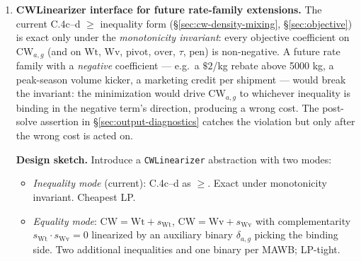 \documentclass[11pt,a4paper]{article}
\theoremstyle{definition}
\begin{document}
\begin{enumerate}
        and broker-of-record handoff as additional supply-option types.
  \item \label{item:cwlinearizer-interface} \textbf{CWLinearizer interface
        for future rate-family extensions.} The current C.4c--d $\geq$
        inequality form (\S\ref{sec:cw-density-mixing}, \S\ref{sec:objective})
        is exact only under the \emph{monotonicity invariant}: every
        objective coefficient on $\text{CW}_{a,g}$ (and on $\text{Wt}$,
        $\text{Wv}$, $\text{pivot}$, $\text{over}$, $\tau$, $\text{pen}$)
        is non-negative. A future rate family with a \emph{negative}
        coefficient --- e.g.\ a $\$2$/kg rebate above 5000 kg, a
        peak-season volume kicker, a marketing credit per shipment ---
        would break the invariant: the minimization would drive
        $\text{CW}_{a,g}$ to whichever inequality is binding in the
        negative term's direction, producing a wrong cost. The post-solve
        assertion in \S\ref{sec:output-diagnostics} catches the
        violation but only after the wrong cost is acted on.

  \textbf{Design sketch.} Introduce a \texttt{CWLinearizer} abstraction
  with two modes:
    \begin{itemize}[noitemsep]
      \item \emph{Inequality mode} (current): C.4c--d as $\geq$. Exact
            under monotonicity invariant. Cheapest LP.
      \item \emph{Equality mode}: $\text{CW} = \text{Wt} + s_{\text{Wt}}$,
            $\text{CW} = \text{Wv} + s_{\text{Wv}}$ with complementarity
            $s_{\text{Wt}} \cdot s_{\text{Wv}} = 0$ linearized by an
            auxiliary binary $\delta_{a,g}$ picking the binding side. Two
            additional inequalities and one binary per MAWB; LP-tight.
    \end{itemize}


\end{enumerate}
\end{document}
